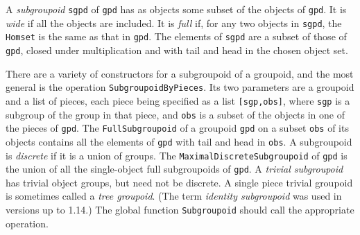 \documentclass[a4paper,11pt]{report}
\begin{document}
{{{ A \emph{subgroupoid} \texttt{sgpd} of \texttt{gpd} has as objects some subset of the objects of \texttt{gpd}. It is \emph{wide} if all the objects are included. It is \emph{full} if, for any two objects in \texttt{sgpd}, the \texttt{Homset} is the same as that in \texttt{gpd}. The elements of \texttt{sgpd} are a subset of those of \texttt{gpd}, closed under multiplication and with tail and head in the chosen object set. 

 There are a variety of constructors for a subgroupoid of a groupoid, and the
most general is the operation \texttt{SubgroupoidByPieces}. Its two parameters are a groupoid and a list of pieces, each piece being
specified as a list \texttt{[sgp,obs]}, where \texttt{sgp} is a subgroup of the group in that piece, and \texttt{obs} is a subset of the objects in one of the pieces of \texttt{gpd}. The \texttt{FullSubgroupoid} of a groupoid \texttt{gpd} on a subset \texttt{obs} of its objects contains all the elements of \texttt{gpd} with tail and head in \texttt{obs}. A subgroupoid is \emph{discrete} if it is a union of groups. The \texttt{MaximalDiscreteSubgroupoid} of \texttt{gpd} is the union of all the single-object full subgroupoids of \texttt{gpd}. A  \emph{trivial subgroupoid} has trivial object groups, but need not be discrete. A single piece trivial
groupoid is sometimes called a  \emph{tree groupoid}. (The term  \emph{identity subgroupoid} was used in versions up to 1.14.) The global function \texttt{Subgroupoid} should call the appropriate operation. 

 }

 
\begin{Verbatim}[commandchars=!@|,fontsize=\small,frame=single,label=Example]
  

\end{Verbatim}}}
\end{document}
